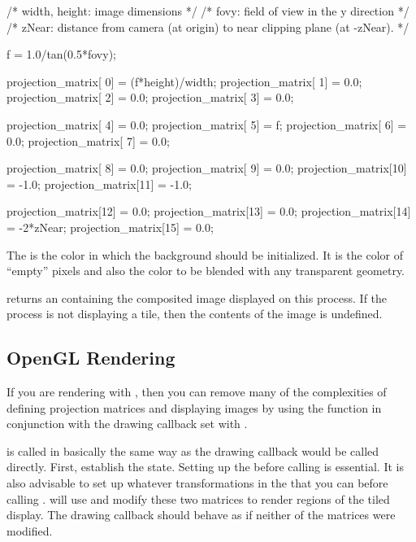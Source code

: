\begin{code}
/* width, height: image dimensions */
/* fovy: field of view in the y direction */
/* zNear: distance from camera (at origin) to near clipping plane (at -zNear). */

f = 1.0/tan(0.5*fovy);

projection_matrix[ 0] = (f*height)/width;
projection_matrix[ 1] = 0.0;
projection_matrix[ 2] = 0.0;
projection_matrix[ 3] = 0.0;

projection_matrix[ 4] = 0.0;
projection_matrix[ 5] = f;
projection_matrix[ 6] = 0.0;
projection_matrix[ 7] = 0.0;

projection_matrix[ 8] = 0.0;
projection_matrix[ 9] = 0.0;
projection_matrix[10] = -1.0;
projection_matrix[11] = -1.0;

projection_matrix[12] = 0.0;
projection_matrix[13] = 0.0;
projection_matrix[14] = -2*zNear;
projection_matrix[15] = 0.0;
\end{code}

The  is the color in which the background should be
initialized.  It is the color of ``empty'' pixels and also the color to be
blended with any transparent geometry.

 returns an  containing the composited
image displayed on this process.  If the process is not displaying a tile,
then the contents of the image is undefined.

\subsection{OpenGL Rendering}
\label{sec:Basic_Usage:Rendering:OpenGL}

If you are rendering with \OpenGL, then you can remove many of the
complexities of defining projection matrices and displaying images by using
the  function in conjunction with the drawing
callback set with .

\begin{Table}{3}
  \quad{}
\end{Table}

 is called in basically the same way as the \OpenGL
{}drawing callback would be called directly.  First,
establish the \OpenGL state.  Setting up the 
before calling  is essential.  It is also advisable
to set up whatever transformations in the 
that you can before calling .  \IceT will use and
modify these two matrices to render regions of the tiled display.  The
drawing callback should behave as if neither of the matrices were modified.

